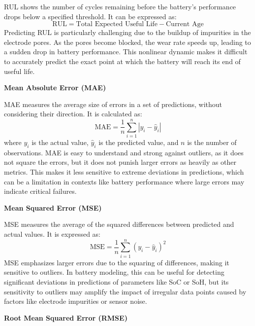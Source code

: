 RUL shows the number of cycles remaining before the battery's performance drops below a specified threshold. It can be expressed as:
\begin{equation}
\text{RUL} = \text{Total Expected Useful Life} - \text{Current Age}
\end{equation}
Predicting RUL is particularly challenging due to the buildup of impurities in the electrode pores. As the pores become blocked, the wear rate speeds up, leading to a sudden drop in battery performance. This nonlinear dynamic makes it difficult to accurately predict the exact point at which the battery will reach its end of useful life.
\vspace{1cm}

\textbf{Mean Absolute Error (MAE)}

MAE measures the average size of errors in a set of predictions, without considering their direction. It is calculated as:
\begin{equation}
\text{MAE} = \frac{1}{n} \sum_{i=1}^{n} |y_i - \hat{y}_i|
\end{equation}
where $y_i$ is the actual value, $\hat{y}_i$ is the predicted value, and $n$ is the number of observations. MAE is easy to understand and strong against outliers, as it does not square the errors, but it does not punish larger errors as heavily as other metrics. This makes it less sensitive to extreme deviations in predictions, which can be a limitation in contexts like battery performance where large errors may indicate critical failures.

\vspace{1cm}
\textbf{Mean Squared Error (MSE)}

MSE measures the average of the squared differences between predicted and actual values. It is expressed as:
\begin{equation}
\text{MSE} = \frac{1}{n} \sum_{i=1}^{n} (y_i - \hat{y}_i)^2
\end{equation}
MSE emphasizes larger errors due to the squaring of differences, making it sensitive to outliers. In battery modeling, this can be useful for detecting significant deviations in predictions of parameters like SoC or SoH, but its sensitivity to outliers may amplify the impact of irregular data points caused by factors like electrode impurities or sensor noise.

\vspace{1cm}
\textbf{Root Mean Squared Error (RMSE)}

